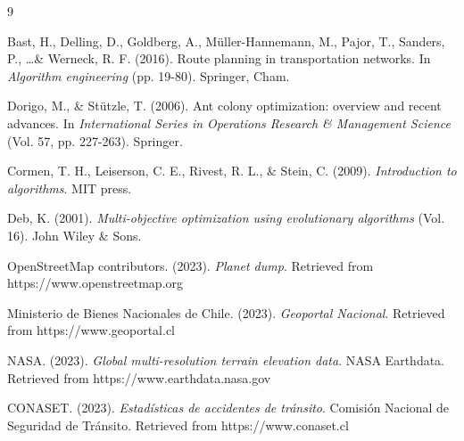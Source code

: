 \documentclass[12pt, a4paper, spanish]{article}
\begin{document}
\begin{thebibliography}{9}

Bast, H., Delling, D., Goldberg, A., Müller-Hannemann, M., Pajor, T., Sanders, P., \ldots \& Werneck, R. F. (2016). Route planning in transportation networks. In \emph{Algorithm engineering} (pp. 19-80). Springer, Cham.

Dorigo, M., \& Stützle, T. (2006). Ant colony optimization: overview and recent advances. In \emph{International Series in Operations Research \& Management Science} (Vol. 57, pp. 227-263). Springer.

Cormen, T. H., Leiserson, C. E., Rivest, R. L., \& Stein, C. (2009). \emph{Introduction to algorithms}. MIT press.

Deb, K. (2001). \emph{Multi-objective optimization using evolutionary algorithms} (Vol. 16). John Wiley \& Sons.

OpenStreetMap contributors. (2023). \emph{Planet dump}. Retrieved from https://www.openstreetmap.org

Ministerio de Bienes Nacionales de Chile. (2023). \emph{Geoportal Nacional}. Retrieved from https://www.geoportal.cl

NASA. (2023). \emph{Global multi-resolution terrain elevation data}. NASA Earthdata. Retrieved from https://www.earthdata.nasa.gov

CONASET. (2023). \emph{Estadísticas de accidentes de tránsito}. Comisión Nacional de Seguridad de Tránsito. Retrieved from https://www.conaset.cl

\end{thebibliography}
\end{document}
